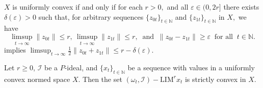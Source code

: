 \documentclass[reqno]{amsart}
\begin{document}
{\begin{lemma}\cite[Lemma 2.3 (a) \& (d)]{xuan2003rough}\label{Th 1.2*} $X$ is uniformly convex if and only if for each $r>0,$ and all $\varepsilon\in(0,2r]$ there exists $\delta(\varepsilon)>0$ such that, for arbitrary  sequences  $\{z_{0t}\}_{t\in\mathbb{N}}$  and  $\{z_{1t}\}_{t\in\mathbb{N}}$ in $X,$ we have
\begin{equation*}
	\limsup_{t\to\infty}\|z_{0t}\|\leq r,~ \limsup_{t\to\infty}\|z_{1t}\|\leq r,~\mbox{ and }~\|z_{0t}-z_{1t}\|\geq\varepsilon~\mbox{ for all }~t\in\mathbb{N}.
\end{equation*}
implies $\displaystyle\limsup_{t\to\infty}{\frac{1}{2}\|z_{0t}+z_{1t}\|}\leq r-\delta(\varepsilon).$
\end{lemma}

\begin{theorem}\label{strict convex}
Let $r\geq 0$, $\mathcal{I}$ be a $P$-ideal, and $\{x_t\}_{t\in\mathbb{N}}$ be a sequence with values in a  uniformly convex normed space $X$. Then the set $(\omega_t,\mathcal{I})-\text{LIM}^{r} x_t$   is strictly convex in $X$. 
\end{theorem}

}
\end{document}
